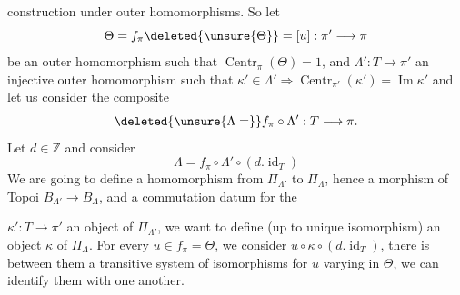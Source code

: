 construction under outer homomorphisms. So let
\[
\Theta=f_\pi\deleted{\unsure{\Theta}}=[u]:\pi'\longrightarrow\pi
\]
be an outer homomorphism such that \(\operatorname{Centr}_\pi(\Theta)=1\),
and \(\Lambda':T\longrightarrow\pi'\) an injective outer homomorphism
such that \(\kappa'\in\Lambda'\Rightarrow\operatorname{Centr}_{\pi'}(\kappa')=\operatorname{Im}\kappa'\)
and let us consider the composite
\[
\deleted{\unsure{\Lambda=}}f_\pi\circ\Lambda':T\longrightarrow\pi.
\]
Let \(d\in\mathbb Z\) and consider
\[
\Lambda=f_\pi\circ\Lambda'\circ(d.\operatorname{id}_T)
\]
We are going to define a homomorphism from \(\Pi_{\Lambda'}\) to \(\Pi_\Lambda\),
hence a morphism of Topoi \(B_{\Lambda'}\longrightarrow B_\Lambda\),
and a commutation datum \inserted{\(\alpha\)} for the

 \(\kappa':T\longrightarrow\pi'\) an object of \(\Pi_{\Lambda'}\),
we want to define (up to unique isomorphism) an
object \(\kappa\) of \(\Pi_\Lambda\). For every \(u\in f_\pi=\Theta\),
we consider \(u\circ\kappa\circ(d.\operatorname{id}_T)\), there is between them
a transitive system of isomorphisms for \(u\) varying
in \(\Theta\), we can identify them with one another.

